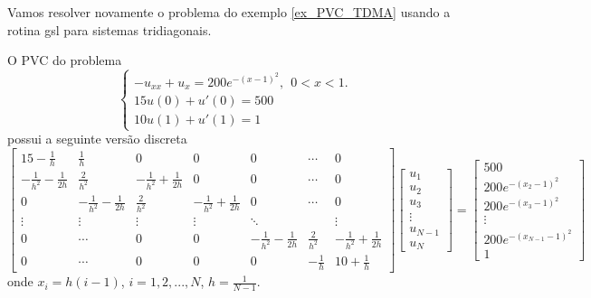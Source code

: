 \begin{ex} Vamos resolver novamente o problema do exemplo \ref{ex_PVC_TDMA} usando a rotina gsl para sistemas tridiagonais.
\end{ex}
O PVC do problema
$$\left\{\begin{array}{l}-u_{xx}+u_x=200e^{-(x-1)^2},~~ 0<x<1.\\
15u(0)+u'(0)=500\\
10u(1)+u'(1)=1\end{array}
\right.
$$
possui a seguinte versão discreta
\begin{equation*}
 \left[\begin{array}{ccccccc}
        15-\frac{1}{h}&\frac{1}{h}&0&0&0&\cdots&0\\
        -\frac{1}{h^2}-\frac{1}{2h}&\frac{2}{h^2}&-\frac{1}{h^2}+\frac{1}{2h}&0&0&\cdots&0\\
              0&  -\frac{1}{h^2}-\frac{1}{2h}&\frac{2}{h^2}&-\frac{1}{h^2}+\frac{1}{2h}&0&\cdots&0\\
              \vdots&\vdots&\vdots&\vdots&\ddots&&\vdots\\
              0&\cdots&0&0& -\frac{1}{h^2}-\frac{1}{2h}&\frac{2}{h^2}&-\frac{1}{h^2}+\frac{1}{2h}\\
              0&\cdots&0&0&0& -\frac{1}{h}&10+\frac{1}{h}
       \end{array}
\right]\left[\begin{array}{c}
             u_1\\u_2\\u_3 \\ \vdots\\ u_{N-1}\\u_N 
             \end{array}
\right]=\left[\begin{array}{c}
             500\\200e^{-(x_2-1)^2}\\200e^{-(x_3-1)^2} \\ \vdots\\ 200e^{-(x_{N-1}-1)^2}\\1 
             \end{array}
\right]
\end{equation*}
onde $x_i=h(i-1)$, $i=1,2,...,N$, $h=\frac{1}{N-1}$.
